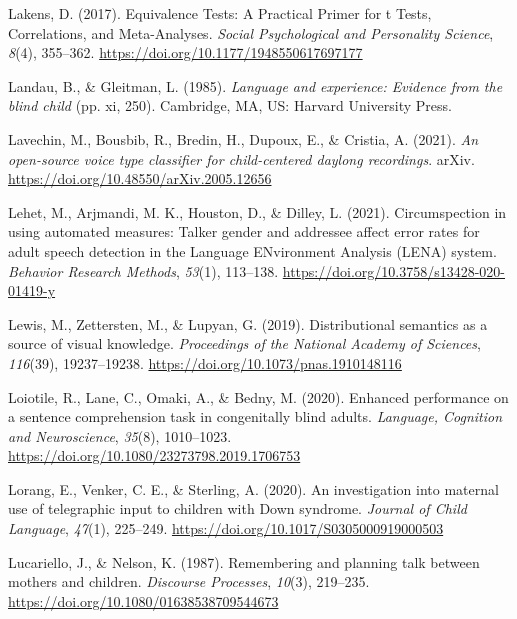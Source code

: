 \documentclass[
  man,floatsintext]{apa6}
\newlength{\cslhangindent}
\newlength{\cslentryspacingunit} %
\newenvironment{CSLReferences}[2] %
 {%
  \setlength{\parindent}{0pt}
  \ifodd #1
  \let\oldpar\par
  \def\par{\hangindent=\cslhangindent\oldpar}
  \fi
  \setlength{\parskip}{#2\cslentryspacingunit}
 }%
 {}
\begin{document}
\begin{CSLReferences}{1}{0}
\leavevmode{}%
Lakens, D. (2017). Equivalence {Tests}: {A Practical Primer} for t {Tests}, {Correlations}, and {Meta-Analyses}. \emph{Social Psychological and Personality Science}, \emph{8}(4), 355--362. \url{https://doi.org/10.1177/1948550617697177}

\leavevmode{}%
Landau, B., \& Gleitman, L. (1985). \emph{Language and experience: {Evidence} from the blind child} (pp. xi, 250). Cambridge, MA, US: Harvard University Press.

\leavevmode{}%
Lavechin, M., Bousbib, R., Bredin, H., Dupoux, E., \& Cristia, A. (2021). \emph{An open-source voice type classifier for child-centered daylong recordings}. arXiv. \url{https://doi.org/10.48550/arXiv.2005.12656}

\leavevmode{}%
Lehet, M., Arjmandi, M. K., Houston, D., \& Dilley, L. (2021). Circumspection in using automated measures: {Talker} gender and addressee affect error rates for adult speech detection in the {Language ENvironment Analysis} ({LENA}) system. \emph{Behavior Research Methods}, \emph{53}(1), 113--138. \url{https://doi.org/10.3758/s13428-020-01419-y}

\leavevmode{}%
Lewis, M., Zettersten, M., \& Lupyan, G. (2019). Distributional semantics as a source of visual knowledge. \emph{Proceedings of the National Academy of Sciences}, \emph{116}(39), 19237--19238. \url{https://doi.org/10.1073/pnas.1910148116}

\leavevmode{}%
Loiotile, R., Lane, C., Omaki, A., \& Bedny, M. (2020). Enhanced performance on a sentence comprehension task in congenitally blind adults. \emph{Language, Cognition and Neuroscience}, \emph{35}(8), 1010--1023. \url{https://doi.org/10.1080/23273798.2019.1706753}

\leavevmode{}%
Lorang, E., Venker, C. E., \& Sterling, A. (2020). An investigation into maternal use of telegraphic input to children with {Down} syndrome. \emph{Journal of Child Language}, \emph{47}(1), 225--249. \url{https://doi.org/10.1017/S0305000919000503}

\leavevmode{}%
Lucariello, J., \& Nelson, K. (1987). Remembering and planning talk between mothers and children. \emph{Discourse Processes}, \emph{10}(3), 219--235. \url{https://doi.org/10.1080/01638538709544673}


\end{CSLReferences}
\end{document}
